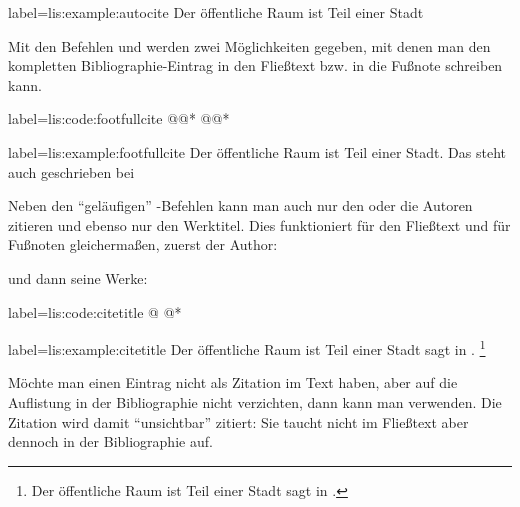 \begin{lfgwexample}{label={lis:example:autocite}}
Der öffentliche Raum ist Teil einer Stadt \autocite{Osland2016} 
\end{lfgwexample}

Mit den Befehlen  und  werden zwei Möglichkeiten gegeben,
mit denen man den kompletten Bibliographie-Eintrag in den Fließtext bzw. in die Fußnote schreiben kann.
\begin{lfgwcode}{label={lis:code:footfullcite}}
\fullcite*@@*
\footfullcite*@@*
\end{lfgwcode} 

\begin{lfgwexample}{label={lis:example:footfullcite}}
Der öffentliche Raum ist Teil einer Stadt.
Das steht auch geschrieben bei 
\end{lfgwexample}



Neben den \enquote{geläufigen} -Befehlen kann man auch nur den oder die Autoren zitieren 
und ebenso nur den Werktitel.
Dies funktioniert für den Fließtext und für Fußnoten gleichermaßen, zuerst der Author:
  und dann seine Werke:
\begin{lfgwcode}{label={lis:code:citetitle}}
\citetitle *@ @*
\end{lfgwcode} 

\begin{lfgwexample}{label={lis:example:citetitle}}
Der öffentliche Raum ist Teil einer Stadt sagt \citeauthor{Osland2016} in .
\footnote{Der öffentliche Raum ist Teil einer Stadt sagt \citeauthor{Osland2016} in .}
\end{lfgwexample}


Möchte man einen Eintrag nicht als Zitation im Text haben, 
aber auf die Auflistung in der Bibliographie nicht verzichten,
dann kann man  verwenden.
Die Zitation wird damit \enquote{unsichtbar} zitiert:
Sie taucht nicht im Fließtext aber dennoch in der Bibliographie auf.

